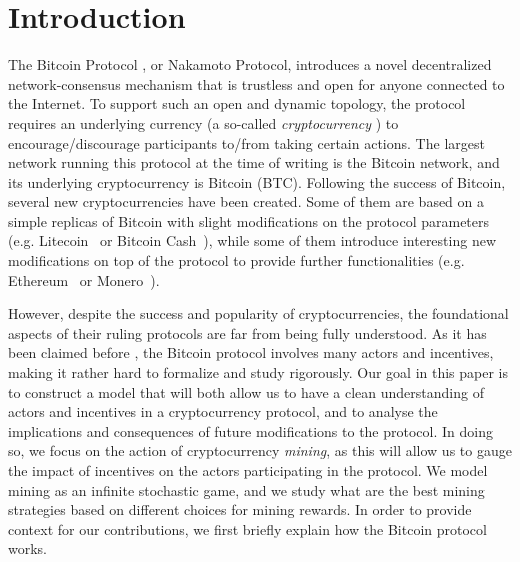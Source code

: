
\section{Introduction}

The Bitcoin Protocol \cite{Bitcoin,DBLP:books/daglib/0040621,NC17}, or Nakamoto Protocol, introduces a novel decentralized network-consensus mechanism that is trustless and open for anyone connected to the Internet. To support such an open and dynamic topology, the protocol requires an underlying currency (a so-called \emph{cryptocurrency} \cite{NC17}) to encourage/discourage participants to/from taking certain actions. The largest network running this protocol at the time of writing is the Bitcoin network, and its underlying cryptocurrency is Bitcoin (BTC). Following the success of Bitcoin, several new cryptocurrencies have been created. Some of them are based on a simple replicas of Bitcoin with slight modifications on the protocol parameters (e.g. Litecoin~\cite{Litecoin} or Bitcoin Cash~\cite{Bcash}), while some of them introduce interesting new modifications on top of the protocol to provide further functionalities (e.g. Ethereum~\cite{Ethereum,E17} or Monero~\cite{Monero}). 
 
However, despite the success and popularity of cryptocurrencies, the foundational aspects of their ruling protocols are far from being fully understood. As it has been claimed before \cite{mininggames:2016}, the Bitcoin protocol involves many actors and incentives, making it rather hard to formalize and study rigorously. Our goal in this paper is to construct a model that will both allow us to have a clean understanding of actors and incentives in a cryptocurrency protocol, and to analyse the implications and consequences of future modifications to the  protocol. In doing so, we focus on the action of cryptocurrency \emph{mining}, as this will allow us to gauge the impact of incentives on the actors participating in the protocol. We model mining as an infinite stochastic game, and we study what are the best mining strategies based on different choices for mining rewards. In order to provide context for our contributions, we first briefly explain how the Bitcoin protocol works.



